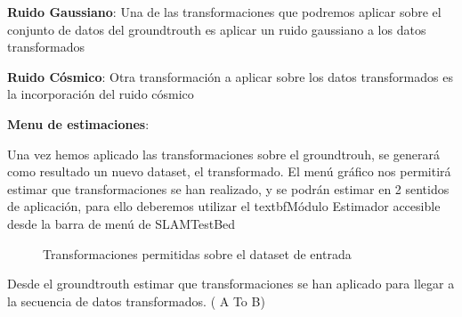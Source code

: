 \textbf{Ruido Gaussiano}: Una de las transformaciones que podremos aplicar sobre el conjunto de datos del groundtrouth es aplicar un ruido gaussiano a los datos transformados

\textbf{Ruido Cósmico}: Otra transformación a aplicar sobre los datos transformados es la incorporación del ruido cósmico

\textbf{Menu de estimaciones}:


Una vez hemos aplicado las transformaciones sobre el groundtrouh, se generará como resultado un nuevo dataset, el transformado.
El menú gráfico nos permitirá estimar que transformaciones se han realizado, y se podrán estimar en 2 sentidos de aplicación, para ello deberemos utilizar el textbf{Módulo Estimador} accesible desde la barra de menú de SLAMTestBed

\begin{figure}[H]
\begin{center}
\hspace{0.5cm}
\end{center}
\caption{Transformaciones permitidas sobre el dataset de entrada }
\end{figure}
	Desde el groundtrouth estimar que transformaciones se han aplicado para llegar a la secuencia de datos transformados. ( A To B)

